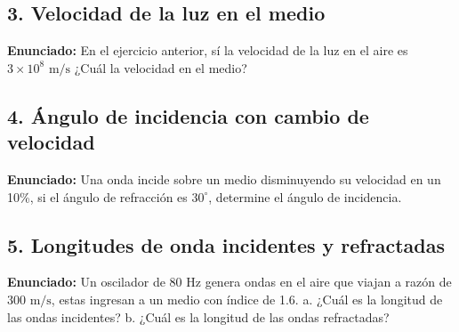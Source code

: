 \documentclass[12pt, letterpaper]{article}
\begin{document}
\subsection*{3. Velocidad de la luz en el medio}
\noindent \textbf{Enunciado:} En el ejercicio anterior, sí la velocidad de la luz en el aire es $3 \times 10^{8} \text{ m/s}$ ¿Cuál la velocidad en el medio?


\subsection*{4. Ángulo de incidencia con cambio de velocidad}
\noindent \textbf{Enunciado:} Una onda incide sobre un medio disminuyendo su velocidad en un 10\%, si el ángulo de refracción es $30^{\circ}$, determine el ángulo de incidencia.


\subsection*{5. Longitudes de onda incidentes y refractadas}
\noindent \textbf{Enunciado:} Un oscilador de 80 Hz genera ondas en el aire que viajan a razón de $300 \text{ m/s}$, estas ingresan a un medio con índice de 1.6. a. ¿Cuál es la longitud de las ondas incidentes? b. ¿Cuál es la longitud de las ondas refractadas?
\end{document}
